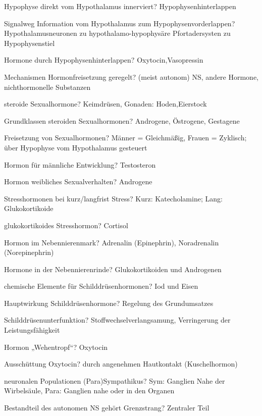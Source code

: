 \documentclass[a4paper]{article}
\begin{document}
\begin{multicols}{3}
  Hypophyse direkt vom Hypothalamus innerviert? Hypophysenhinterlappen

  Signalweg Information vom Hypothalamus zum Hypophysenvorderlappen? Hypothalamusneuronen zu hypothalamo-hypophysäre Pfortadersysten zu Hypophysenstiel

  Hormone durch Hypophysenhinterlappen? Oxytocin,Vasopressin

  Mechanismen Hormonfreisetzung geregelt? (meist autonom) NS, andere Hormone, nichthormonelle Substanzen

  steroide Sexualhormone? Keimdrüsen, Gonaden: Hoden,Eierstock

  Grundklassen steroiden Sexualhormonen? Androgene, Östrogene, Gestagene

  Freisetzung von Sexualhormonen? Männer = Gleichmäßig, Frauen = Zyklisch; über Hypophyse vom Hypothalamus gesteuert

  Hormon für männliche Entwicklung? Testosteron

  Hormon weibliches Sexualverhalten? Androgene

  Stresshormonen bei kurz/langfrist Stress? Kurz: Katecholamine; Lang: Glukokortikoide

  glukokortikoides Stresshormon? Cortisol

  Hormon im Nebennierenmark? Adrenalin (Epinephrin), Noradrenalin (Norepinephrin)

  Hormone in der Nebennierenrinde? Glukokortikoiden und Androgenen


  chemische Elemente für Schilddrüsenhormonen? Iod und Eisen

  Hauptwirkung Schilddrüsenhormone? Regelung des Grundumsatzes

  Schilddrüsenunterfunktion? Stoffwechselverlangsamung, Verringerung der Leistungsfähigkeit

  Hormon „Wehentropf“? Oxytocin

  Ausschüttung Oxytocin? durch angenehmen Hautkontakt (Kuschelhormon)

  neuronalen Populationen (Para)Sympathikus? Sym: Ganglien Nahe der Wirbelsäule, Para: Ganglien nahe oder in den Organen

  Bestandteil des autonomen NS gehört Grenzstrang? Zentraler Teil


\end{multicols}
\end{document}
